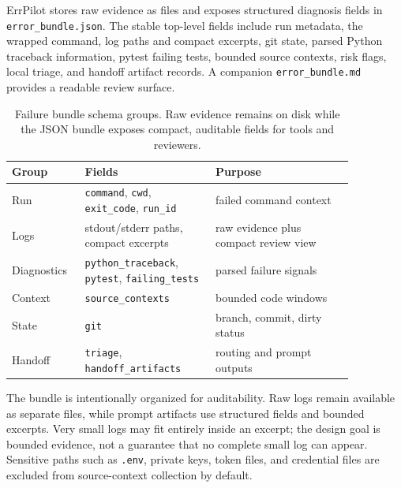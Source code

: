 \documentclass[sigconf]{acmart}
\begin{document}
ErrPilot stores raw evidence as files and exposes structured diagnosis fields in
\texttt{error\_bundle.json}. The stable top-level fields include run metadata,
the wrapped command, log paths and compact excerpts, git state, parsed Python
traceback information, pytest failing tests, bounded source contexts, risk
flags, local triage, and handoff artifact records. A companion
\texttt{error\_bundle.md} provides a readable review surface.

\begin{table}[t]
  \caption{Failure bundle schema groups. Raw evidence remains on disk while the
  JSON bundle exposes compact, auditable fields for tools and reviewers.}
  \label{tab:schema}
  \small
  \begin{tabular}{p{0.16\linewidth}p{0.34\linewidth}p{0.36\linewidth}}
    \toprule
    Group & Fields & Purpose \\
    \midrule
    Run & \texttt{command}, \texttt{cwd}, \texttt{exit\_code}, \texttt{run\_id}
      & failed command context \\
    Logs & stdout/stderr paths, compact excerpts
      & raw evidence plus compact review view \\
    Diagnostics & \texttt{python\_traceback}, \texttt{pytest}, \texttt{failing\_tests}
      & parsed failure signals \\
    Context & \texttt{source\_contexts}
      & bounded code windows \\
    State & \texttt{git}
      & branch, commit, dirty status \\
    Handoff & \texttt{triage}, \texttt{handoff\_artifacts}
      & routing and prompt outputs \\
    \bottomrule
  \end{tabular}
\end{table}

The bundle is intentionally organized for auditability. Raw logs remain
available as separate files, while prompt artifacts use structured fields and
bounded excerpts. Very small logs may fit entirely inside an excerpt; the design
goal is bounded evidence, not a guarantee that no complete small log can appear.
Sensitive paths such as \texttt{.env}, private keys, token files, and credential
files are excluded from source-context collection by default.
\end{document}
